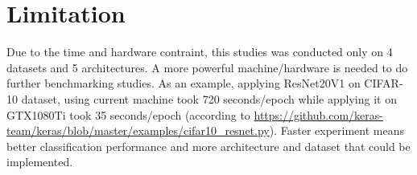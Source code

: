 \section{Limitation}
Due to the time and hardware contraint, this studies was conducted only on 4 datasets and 5 architectures. A more powerful machine/hardware is needed to do further benchmarking studies. As an example, applying ResNet20V1 on CIFAR-10 dataset, using current machine took 720 seconds/epoch while applying it on GTX1080Ti took 35 seconds/epoch (according to \href{https://github.com/keras-team/keras/blob/master/examples/cifar10\_resnet.py}{https://github.com/keras-team/keras/blob/master/examples/cifar10\_resnet.py}). Faster experiment means better classification performance and more architecture and dataset that could be implemented. 